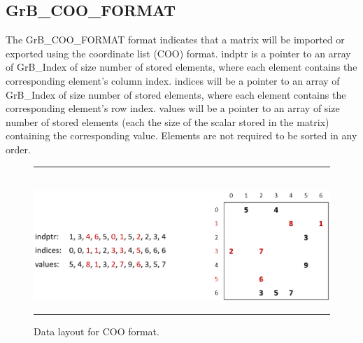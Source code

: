 \subsection{{\sf GrB\_COO\_FORMAT}}

The {\sf GrB\_COO\_FORMAT} format
indicates that a matrix will be imported or exported using the coordinate list
(COO) format.  {\sf indptr} is a pointer to an array of {\sf GrB\_Index} of size 
number of stored elements,
where each element contains the corresponding element's column index.
{\sf indices} will be a pointer to an array of {\sf GrB\_Index} of size 
number of stored elements, where each
element contains the corresponding element's row index.
{\sf values} will be a pointer to an array of size number of
stored elements (each the size of the scalar stored in the matrix) containing the corresponding value. Elements
are not required to be sorted in any order.

\begin{figure}[h]
    \hrule
    \begin{center}
        ~\\
        \includegraphics[width=4.5in]{GrB_COO_FORMAT.png}
    \end{center}
    \vspace{-1em}
    \caption{Data layout for COO format.}
    \label{Fig:COO_format}
    \hrule
\end{figure}

